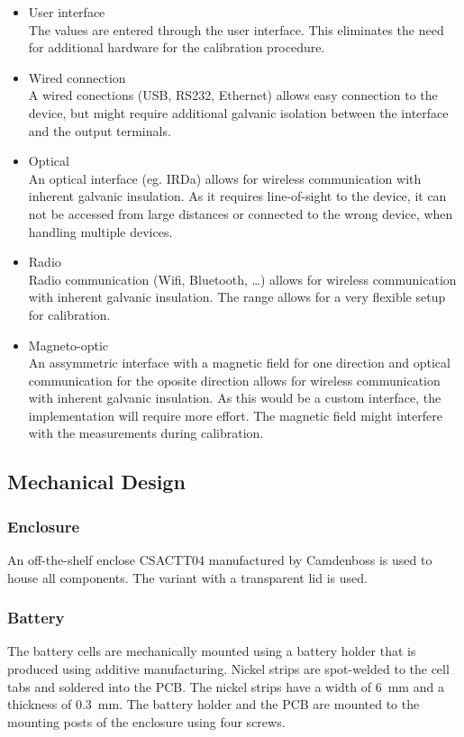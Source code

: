 \begin{itemize}
    \item User interface
        \\
        The values are entered through the user interface. This eliminates the need for additional hardware for the calibration procedure. 
    \item Wired connection
        \\
        A wired conections (\ac{USB}, RS232, Ethernet) allows easy connection to the device, but might require additional galvanic isolation between the interface and the output terminals. 
    \item Optical
        \\
        An optical interface (eg. IRDa) allows for wireless communication with inherent galvanic insulation. As it requires line-of-sight to the device, it can not be accessed from large distances or connected to the wrong device, when handling multiple devices. 
    \item Radio
        \\
        Radio communication (Wifi, Bluetooth, \ldots) allows for wireless communication with inherent galvanic insulation. The range allows for a very flexible setup for calibration. 
    \item Magneto-optic
        \\
        An assymmetric interface with a magnetic field for one direction and optical communication for the oposite direction allows for wireless communication with inherent galvanic insulation. As this would be a custom interface, the implementation will require more effort. The magnetic field might interfere with the measurements during calibration. 
\end{itemize}

\FloatBarrier
\subsection{Mechanical Design}

\subsubsection{Enclosure}
An off-the-shelf enclose CSACTT04 manufactured by Camdenboss is used to house all components. The variant with a transparent lid is used. 

\subsubsection{Battery}
The battery cells are mechanically mounted using a battery holder that is produced using additive manufacturing.  
Nickel strips are spot-welded to the cell tabs and soldered into the PCB. The nickel strips have a width of \qty{6}{\milli\meter} and a thickness of \qty{0.3}{\milli\meter}. 
The battery holder and the \ac{PCB} are mounted to the mounting posts of the enclosure using four screws. 

